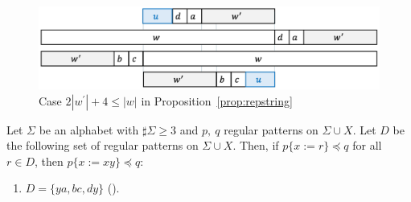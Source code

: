 \begin{figure}[t]
\begin{center}
  \includegraphics[scale=0.345]{figs/w=2w_1+4.pdf}
  \caption{Case $2|w^{\prime}| + 4 \leq |w|$ in Proposition~\ref{prop:repstring}}\label{fig:prop_pic10}
\end{center}
\end{figure}

\begin{lem}\label{lem:addpart}
  Let $\Sigma$ be an alphabet with $\sharp\Sigma \ge 3$ and $p,~q$ regular patterns on $\Sigma\cup X$.
  Let $D$ be the following set of regular patterns on $\Sigma\cup X$.
  Then, if $p \{ x := r \} \preceq q$ for all $r \in D$, then $p \{ x := xy \} \preceq q$:
  \begin{enumerate}
  \item[] $D = \{ ya, bc, dy \}$ (\TheConditionA).
  \end{enumerate}
\end{lem}

